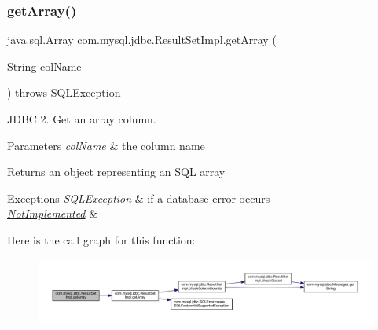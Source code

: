 \subsubsection{\texorpdfstring{get\+Array()}{getArray()}\hspace{0.1cm}{\footnotesize\ttfamily [2/2]}}
{\footnotesize\ttfamily java.\+sql.\+Array com.\+mysql.\+jdbc.\+Result\+Set\+Impl.\+get\+Array (\begin{DoxyParamCaption}\item[{String}]{col\+Name }\end{DoxyParamCaption}) throws S\+Q\+L\+Exception}

J\+D\+BC 2. Get an array column.


\begin{DoxyParams}{Parameters}
{\em col\+Name} & the column name\\
\hline
\end{DoxyParams}
\begin{DoxyReturn}{Returns}
an object representing an S\+QL array
\end{DoxyReturn}

\begin{DoxyExceptions}{Exceptions}
{\em S\+Q\+L\+Exception} & if a database error occurs \\
\hline
{\em \mbox{\hyperlink{classcom_1_1mysql_1_1jdbc_1_1_not_implemented}{Not\+Implemented}}} & \\
\hline
\end{DoxyExceptions}
Here is the call graph for this function\+:
\nopagebreak
\begin{figure}[H]
\begin{center}
\leavevmode
\includegraphics[width=350pt]{classcom_1_1mysql_1_1jdbc_1_1_result_set_impl_a47d8389da497a88335d4ef11c611e8f7_cgraph}
\end{center}
\end{figure}
\mbox{\label{classcom_1_1mysql_1_1jdbc_1_1_result_set_impl_a3121b8b483b8b8bfcdf6b1b977a60808}} 
